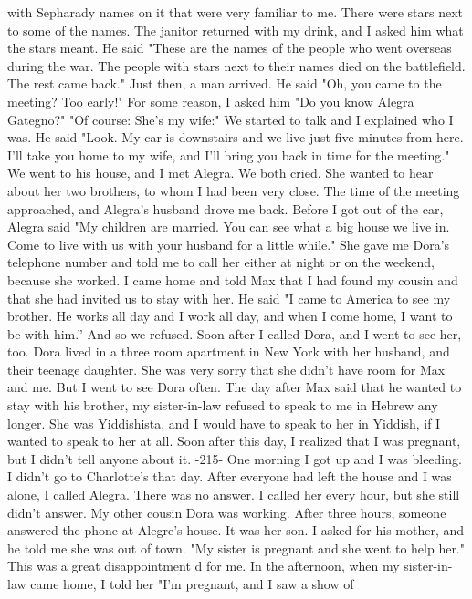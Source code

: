 with Sepharady names on it that were very familiar to me.
There were stars next to 
some of the names.
The janitor returned with my drink, and I asked him what the stars 
meant.
He said "These are the names of the people who went overseas during the war.
The 
people with stars next to their names died on the battlefield.
The rest came back."
Just then, a man arrived.
He said "Oh, you came to the meeting?
Too early!"
For some reason, I asked him "Do you know Alegra Gategno?"
"Of course: She's my wife:" 
We started to talk and I explained who I was.
He said "Look.
My car is downstairs 
and we live just five minutes from here.
I’ll take you home to my wife, and I'll 
bring you back in time for the meeting."
We went to his house, and I met Alegra.
We both cried.
She wanted to hear about 
her two brothers, to whom I had been very close.
The time of the meeting approached, 
and Alegra's husband drove me back.
Before I got out of the car, Alegra said "My children are married.
You can see what a big house we live in.
Come to live with us with 
your husband for a little while."
She gave me Dora's telephone number and told me to 
call her either at night or on the weekend, because she worked.
I came home and told Max that I had found my cousin and that she had invited us to 
stay with her.
He said "I came to America to see my brother.
He works all day and I work all day, and when I come home, I want to be with him.” And so we refused.
Soon after I called Dora, and I went to see her, too.
Dora lived in a three 
room apartment in New York with her husband, and their teenage daughter.
She was 
very sorry that she didn't have room for Max and me.
But I went to see Dora often.
The day after Max said that he wanted to stay with his brother, my sister-in-law 
refused to speak to me in Hebrew any longer.
She was Yiddishista, and I would have 
to speak to her in Yiddish, if I wanted to speak to her at all.
Soon after this 
day, I realized that I was pregnant, but I didn't tell anyone about it.
-215- 
One morning I got up and I was bleeding.
I didn't go to Charlotte's that day.
After everyone had left the house and I was alone, I called Alegra.
There was no answer.
I called her every hour, but she still didn't answer.
My other cousin Dora was 
working.
After three hours, someone answered the phone at Alegre's house.
It was her 
son.
I asked for his mother, and he told me she was out of town.
"My sister is pregnant and she went to help her."
This was a great disappointment d for me.
In the afternoon, when my sister-in-law came home, I told her "I'm pregnant, and I saw a show of 
